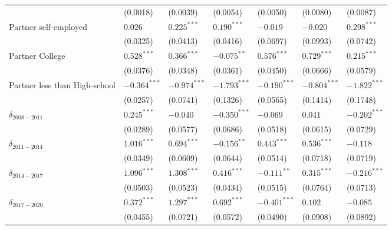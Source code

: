 \begin{tabular}{lllllll}
                              &        (0.0018) &        (0.0039) &        (0.0054) &        (0.0050) &        (0.0080) &        (0.0087) \\
Partner self-employed         &         $0.026$ &   $0.225^{***}$ &   $0.190^{***}$ &        $-0.019$ &        $-0.020$ &   $0.298^{***}$ \\
                              &        (0.0325) &        (0.0413) &        (0.0416) &        (0.0697) &        (0.0993) &        (0.0742) \\
Partner College               &   $0.528^{***}$ &   $0.366^{***}$ &   $-0.075^{**}$ &   $0.576^{***}$ &   $0.729^{***}$ &   $0.215^{***}$ \\
                              &        (0.0376) &        (0.0348) &        (0.0361) &        (0.0450) &        (0.0666) &        (0.0579) \\
Partner less than High-school &  $-0.364^{***}$ &  $-0.974^{***}$ &  $-1.793^{***}$ &  $-0.190^{***}$ &  $-0.804^{***}$ &  $-1.822^{***}$ \\
                              &        (0.0257) &        (0.0741) &        (0.1326) &        (0.0565) &        (0.1414) &        (0.1748) \\
$\delta_{2008-2011}$          &   $0.245^{***}$ &        $-0.040$ &  $-0.350^{***}$ &        $-0.069$ &         $0.041$ &  $-0.202^{***}$ \\
                              &        (0.0289) &        (0.0577) &        (0.0686) &        (0.0518) &        (0.0615) &        (0.0729) \\
$\delta_{2011-2014}$          &   $1.016^{***}$ &   $0.694^{***}$ &   $-0.156^{**}$ &   $0.443^{***}$ &   $0.536^{***}$ &        $-0.118$ \\
                              &        (0.0349) &        (0.0609) &        (0.0644) &        (0.0514) &        (0.0718) &        (0.0719) \\
$\delta_{2014-2017}$          &   $1.096^{***}$ &   $1.308^{***}$ &   $0.416^{***}$ &   $-0.111^{**}$ &   $0.315^{***}$ &  $-0.216^{***}$ \\
                              &        (0.0503) &        (0.0523) &        (0.0434) &        (0.0515) &        (0.0764) &        (0.0713) \\
$\delta_{2017-2020}$          &   $0.372^{***}$ &   $1.297^{***}$ &   $0.692^{***}$ &  $-0.401^{***}$ &         $0.102$ &        $-0.085$ \\
                              &        (0.0455) &        (0.0721) &        (0.0572) &        (0.0490) &        (0.0908) &        (0.0892) \\

\end{tabular}
